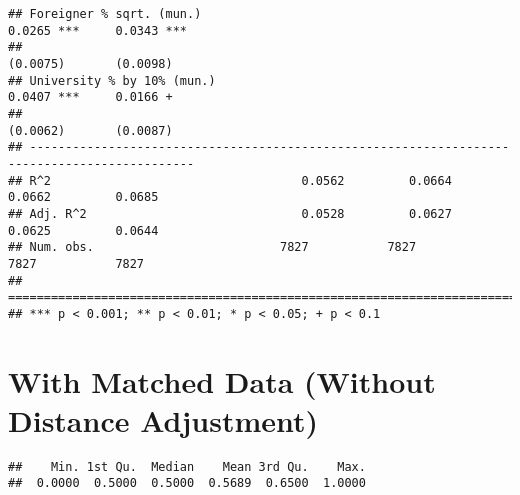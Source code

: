 \documentclass[
]{article}
\newenvironment{Shaded}{\begin{snugshade}}{\end{snugshade}}
\newcommand{\DecValTok}[1]{\textcolor[rgb]{0.00,0.00,0.81}{#1}}
\newcommand{\FloatTok}[1]{\textcolor[rgb]{0.00,0.00,0.81}{#1}}
\newcommand{\KeywordTok}[1]{\textcolor[rgb]{0.13,0.29,0.53}{\textbf{#1}}}
\newcommand{\NormalTok}[1]{#1}
\newcommand{\OperatorTok}[1]{\textcolor[rgb]{0.81,0.36,0.00}{\textbf{#1}}}
\newcommand{\StringTok}[1]{\textcolor[rgb]{0.31,0.60,0.02}{#1}}
\begin{document}
\begin{verbatim}
## Foreigner % sqrt. (mun.)                                            0.0265 ***     0.0343 ***
##                                                                    (0.0075)       (0.0098)   
## University % by 10% (mun.)                                          0.0407 ***     0.0166 +  
##                                                                    (0.0062)       (0.0087)   
## ---------------------------------------------------------------------------------------------
## R^2                                   0.0562         0.0664         0.0662         0.0685    
## Adj. R^2                              0.0528         0.0627         0.0625         0.0644    
## Num. obs.                          7827           7827           7827           7827         
## =============================================================================================
## *** p < 0.001; ** p < 0.01; * p < 0.05; + p < 0.1
\end{verbatim}

\hypertarget{with-matched-data-without-distance-adjustment}{%
\section{With Matched Data (Without Distance
Adjustment)}\label{with-matched-data-without-distance-adjustment}}

\begin{Shaded}
\end{Shaded}

\begin{verbatim}
##    Min. 1st Qu.  Median    Mean 3rd Qu.    Max. 
##  0.0000  0.5000  0.5000  0.5689  0.6500  1.0000
\end{verbatim}
\end{document}
